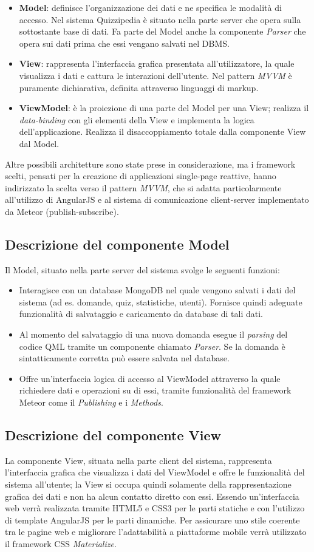 \begin {itemize}
\item\textbf{Model}: definisce l'organizzazione dei dati e ne specifica le modalità di accesso. Nel sistema Quizzipedia è situato nella parte server che opera sulla sottostante base di dati. Fa parte del Model anche la componente \emph{Parser} che opera sui dati prima che essi vengano salvati nel DBMS.
\item\textbf{View}: rappresenta l'interfaccia grafica presentata all'utilizzatore, la quale visualizza i dati e cattura le interazioni dell'utente. Nel pattern \emph{MVVM} è puramente dichiarativa, definita attraverso linguaggi di markup. 
\item\textbf{ViewModel}: è la proiezione di una parte del Model per una View; realizza il \emph{data-binding} con gli elementi della View e implementa la logica dell'applicazione. 
Realizza il disaccoppiamento totale dalla componente View dal Model.
	\end {itemize}
	Altre possibili architetture sono state prese in considerazione, ma i framework scelti, pensati per la creazione di applicazioni single-page reattive, hanno indirizzato la scelta verso il pattern \emph{MVVM}, che si adatta particolarmente all'utilizzo di AngularJS e al sistema di comunicazione client-server implementato da Meteor (publish-subscribe).

	\subsection{Descrizione del componente Model}
	Il Model, situato nella parte server del sistema svolge le seguenti funzioni:
	\begin{itemize}
		\item Interagisce con un database MongoDB nel quale vengono salvati i dati del sistema (ad es. domande, quiz, statistiche, utenti). Fornisce quindi adeguate funzionalità di salvataggio e caricamento da database di tali dati.
		\item Al momento del salvataggio di una nuova domanda esegue il \emph{parsing} del codice QML tramite un componente chiamato \emph{Parser}. Se la domanda è sintatticamente corretta può essere salvata nel database.
		\item Offre un'interfaccia logica di accesso al ViewModel attraverso la quale richiedere dati e operazioni su di essi, tramite funzionalità del framework Meteor come il \emph{Publishing} e i \emph{Methods}.
	\end{itemize}
	\subsection{Descrizione del componente View}
	La componente View, situata nella parte client del sistema, rappresenta l'interfaccia grafica che visualizza i dati del ViewModel e offre le funzionalità del sistema all'utente; la View si occupa quindi solamente della rappresentazione grafica dei dati e non ha alcun contatto diretto con essi. Essendo un'interfaccia web verrà realizzata tramite HTML5 e CSS3 per le parti statiche e con l'utilizzo di template AngularJS per le parti dinamiche. Per assicurare uno stile coerente tra le pagine web e migliorare l'adattabilità a piattaforme mobile verrà utilizzato il framework CSS \emph{Materialize}.
